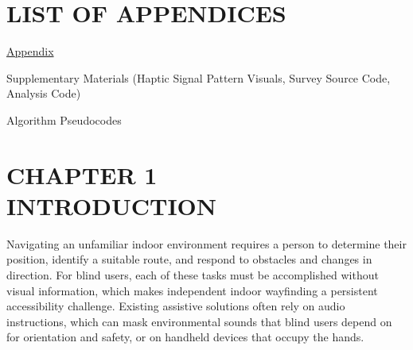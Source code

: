 \documentclass[12pt]{report}
\begin{document}
\listoftables
{}
\clearpage

\chapter*{LIST OF APPENDICES}
\thispagestyle{fancy}

\noindent\underline{Appendix}

\vspace{6pt}
\begin{list}{}{%
  \setlength{\leftmargin}{1.5cm}
  \setlength{\labelwidth}{1cm}
  \setlength{\labelsep}{0.5cm}
  \setlength{\itemsep}{6pt}
  \setlength{\parsep}{0pt}
}
\item[A.] Supplementary Materials (Haptic Signal Pattern Visuals, Survey Source Code, Analysis Code)\dotfill
\item[B.] Algorithm Pseudocodes\dotfill
\end{list}

\clearpage

\setcounter{page}{1}


\chapter*{\centering CHAPTER 1\\[4pt]INTRODUCTION}
\thispagestyle{fancy}

Navigating an unfamiliar indoor environment requires a person to determine their position, identify a suitable route, and respond to obstacles and changes in direction. For blind users, each of these tasks must be accomplished without visual information, which makes independent indoor wayfinding a persistent accessibility challenge. Existing assistive solutions often rely on audio instructions, which can mask environmental sounds that blind users depend on for orientation and safety, or on handheld devices that occupy the hands.
\end{document}
